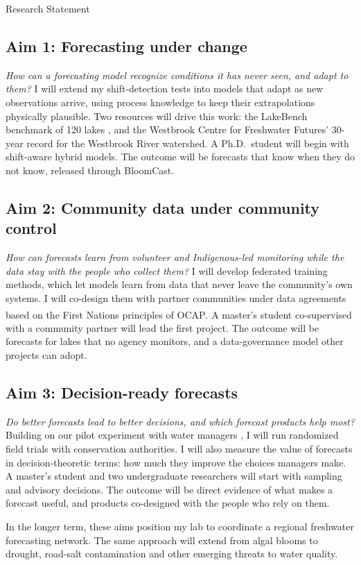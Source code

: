 \begin{applicationdocument}[
  page limit = 4,
  subtitle   = {Prepared for the position of \PositionSummary},
]{Research Statement}
\subsection{Aim 1: Forecasting under change}
\emph{How can a forecasting model recognize conditions it has never seen,
and adapt to them?} I will extend my shift-detection tests
\cite{ellis2026shift} into models that adapt as new observations arrive,
using process knowledge to keep their extrapolations physically plausible.
Two resources will drive this work: the LakeBench benchmark of 120 lakes
\cite{patel2026benchmark}, and the Westbrook Centre for Freshwater Futures'
30-year record for the Westbrook River watershed. A Ph.D.\ student will
begin with shift-aware hybrid models. The outcome will be forecasts that
know when they do not know, released through BloomCast.

\subsection{Aim 2: Community data under community control}
\emph{How can forecasts learn from volunteer and Indigenous-led monitoring
while the data stay with the people who collect them?} I will develop
federated training methods, which let models learn from data that never
leave the community's own systems. I will co-design them with partner
communities under data agreements based on the First Nations principles of
OCAP\textsuperscript{\textregistered}. A master's student co-supervised with
a community partner will lead the first project. The outcome will be
forecasts for lakes that no agency monitors, and a data-governance model
other projects can adopt.

\subsection{Aim 3: Decision-ready forecasts}
\emph{Do better forecasts lead to better decisions, and which forecast
products help most?} Building on our pilot experiment with water managers
\cite{ellis2026decisions}, I will run randomized field trials with
conservation authorities. I will also measure the value of forecasts in
decision-theoretic terms: how much they improve the choices managers make.
A master's student and two undergraduate researchers will start with
sampling and advisory decisions. The outcome will be direct evidence of
what makes a forecast useful, and products co-designed with the people who
rely on them.

In the longer term, these aims position my lab to coordinate a regional
freshwater forecasting network. The same approach will extend from algal
blooms to drought, road-salt contamination and other emerging threats to
water quality.


\end{applicationdocument}
